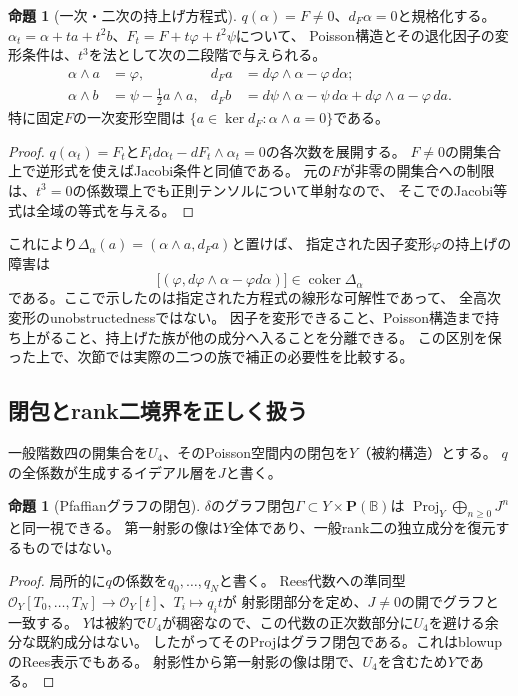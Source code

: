 \documentclass[a4paper,11pt]{ltjsarticle}
\theoremstyle{definition}
\newtheorem{proposition}[theorem]{命題}
\theoremstyle{definition}\newtheorem{definition}[theorem]{定義}
\theoremstyle{remark}\newtheorem{remark}[theorem]{注意}
\newcommand{\PP}{\mathbf P}\newcommand{\CC}{\mathbf C}
\newcommand{\cO}{\mathcal O}\newcommand{\cP}{\mathcal P}
\begin{document}
\begin{proposition}[一次・二次の持上げ方程式]\label{prop:lifting}
$q(\alpha)=F\ne0$、$d_F\alpha=0$と規格化する。
$\alpha_t=\alpha+ta+t^2b$、$F_t=F+t\varphi+t^2\psi$について、
Poisson構造とその退化因子の変形条件は、$t^3$を法として次の二段階で与えられる。
\begin{align}
 \alpha\wedge a&=\varphi,&
 d_Fa&=d\varphi\wedge\alpha-\varphi\,d\alpha; \tag{5.1}\label{eq:firstlift}\\
 \alpha\wedge b&=\psi-\tfrac12a\wedge a,&
 d_Fb&=d\psi\wedge\alpha-\psi\,d\alpha+d\varphi\wedge a-\varphi\,da.\tag{5.2}\label{eq:secondlift}
\end{align}
特に固定$F$の一次変形空間は
$\{a\in\ker d_F:\alpha\wedge a=0\}$である。
\end{proposition}
\begin{proof}
$q(\alpha_t)=F_t$と$F_t d\alpha_t-dF_t\wedge\alpha_t=0$の各次数を展開する。
$F\ne0$の開集合上で逆形式を使えばJacobi条件と同値である。
元の$F$が非零の開集合への制限は、$t^3=0$の係数環上でも正則テンソルについて単射なので、
そこでのJacobi等式は全域の等式を与える。
\end{proof}

これにより$\Delta_\alpha(a)=(\alpha\wedge a,d_Fa)$と置けば、
指定された因子変形$\varphi$の持上げの障害は
\[
 \bigl[(\varphi,d\varphi\wedge\alpha-\varphi d\alpha)\bigr]
       \in\operatorname{coker}\Delta_\alpha
\]
である。ここで示したのは指定された方程式の線形な可解性であって、
全高次変形のunobstructednessではない。
因子を変形できること、Poisson構造まで持ち上がること、持上げた族が他の成分へ入ることを分離できる。
この区別を保った上で、次節では実際の二つの族で補正の必要性を比較する。



\subsection{閉包とrank二境界を正しく扱う}
一般階数四の開集合を$U_4$、そのPoisson空間内の閉包を$Y$（被約構造）とする。
$q$の全係数が生成するイデアル層を$J$と書く。

\begin{proposition}[Pfaffianグラフの閉包]\label{prop:graph}
$\delta$のグラフ閉包$\Gamma\subset Y\times\PP(\mathbb B)$は
$\operatorname{Proj}_Y\bigoplus_{n\ge0}J^n$と同一視できる。
第一射影の像は$Y$全体であり、一般rank二の独立成分を復元するものではない。
\end{proposition}
\begin{proof}
局所的に$q$の係数を$q_0,\ldots,q_N$と書く。
Rees代数への準同型$\cO_Y[T_0,\ldots,T_N]\to\cO_Y[t]$、$T_i\mapsto q_it$が
射影閉部分を定め、$J\ne0$の開でグラフと一致する。
$Y$は被約で$U_4$が稠密なので、この代数の正次数部分に$U_4$を避ける余分な既約成分はない。
したがってそのProjはグラフ閉包である。これはblowupのRees表示でもある\cite{StacksBlowup}。
射影性から第一射影の像は閉で、$U_4$を含むため$Y$である。
\end{proof}
\end{document}
